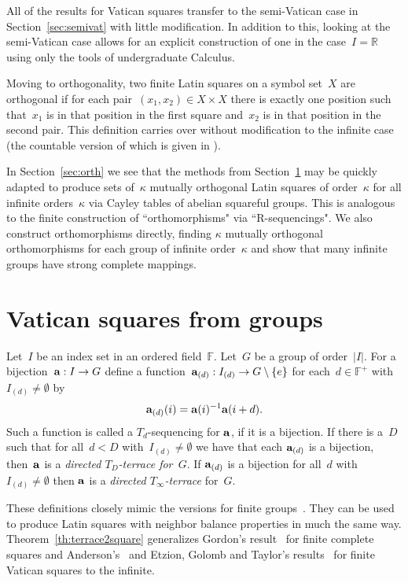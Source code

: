 \documentclass[12pt,a4paper]{article}
\newcommand{\R}{\mathbb{R}}
\newcommand{\F}{\mathbb{F}}
\renewcommand{\a}{\textup{\textbf{a}}}
\begin{document}
All of the results for Vatican squares transfer to the semi-Vatican case in Section~\ref{sec:semivat} with little modification.  In addition to this, looking at the semi-Vatican case allows for an explicit construction of one in the case~$I = \R$ using only the tools of undergraduate Calculus.


Moving to orthogonality, two finite Latin squares on a symbol set~$X$ are orthogonal if for  each pair~$(x_1, x_2) \in X \times X$ there is exactly one position such that~$x_1$ is in that position in the first square and~$x_2$ is in that position in the second pair.  This definition carries over without modification to the infinite case (the countable version of which is given in \cite[p.~116]{DK15}).

In Section~\ref{sec:orth} we see that the methods from Section~\ref{sec:cayley} may be quickly adapted to produce sets of~$\kappa$ mutually orthogonal Latin squares of order~$\kappa$ for all infinite orders~$\kappa$ via Cayley tables of abelian squareful groups.  This is analogous to the finite construction of ``orthomorphisms" via ``R-sequencings".   We also construct orthomorphisms directly, finding $\kappa$ mutually orthogonal orthomorphisms for each group of infinite order~$\kappa$ and show that many infinite groups have strong complete mappings.


\section{Vatican squares from groups}\label{sec:cayley}


Let~$I$ be an index set in an ordered field~$\F$.  Let~$G$ be a group of order~$|I|$.  For a bijection~${\bf a}: I \rightarrow G$ define a function~${\bf a}_{(d)}: I_{(d)} \rightarrow G \setminus \{ e \}$ for each~$d \in \F^+$ with~$I_{(d)} \neq \emptyset$ by
$${\bf a}_{(d)}(i) = {\bf a}(i)^{-1}{\bf a}(i+d).$$ Such a function is called a $T_d$-sequencing for $\a$, if it is a bijection.
If there is a~$D$ such that for all~$d < D$ with~$I_{(d)} \neq \emptyset$ we have that each ${\bf a}_{(d)}$ is a bijection, then~${\bf a}$ is a {\em directed $T_D$-terrace for~$G$}.  If ${\bf a}_{(d)}$ is a bijection for all~$d$  with~$I_{(d)} \neq \emptyset$ then ${\bf a}$ is  a {\em directed $T_{\infty}$-terrace} for~$G$.

These definitions closely mimic the versions for finite groups~\cite{Anderson90}.   They can be used to produce Latin squares with neighbor balance properties in much the same way.  Theorem~\ref{th:terrace2square} generalizes Gordon's result~\cite{Gordon61} for finite complete squares and Anderson's~\cite{Anderson90} and Etzion, Golomb and Taylor's results~\cite{EGT89} for finite Vatican squares to the infinite.  
\end{document}
